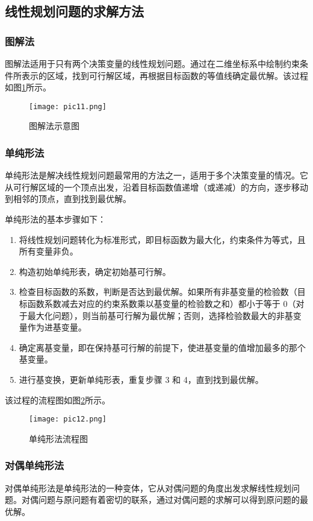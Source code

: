 \documentclass[bachelor]{thesis-uestc}
\begin{document}
\subsection{线性规划问题的求解方法}
\subsubsection{图解法}
图解法适用于只有两个决策变量的线性规划问题。通过在二维坐标系中绘制约束条件所表示的区域，找到可行解区域，再根据目标函数的等值线确定最优解。该过程如图\ref{pic11}所示。
\begin{figure}[h]
    \texttt{[image: pic11.png]}
    \caption{图解法示意图}
    \label{pic11}
    \end{figure}

    \subsubsection{单纯形法}
    单纯形法是解决线性规划问题最常用的方法之一，适用于多个决策变量的情况。它从可行解区域的一个顶点出发，沿着目标函数值递增（或递减）的方向，逐步移动到相邻的顶点，直到找到最优解。
    
    单纯形法的基本步骤如下：
    \begin{enumerate}
        \item 将线性规划问题转化为标准形式，即目标函数为最大化，约束条件为等式，且所有变量非负。
        \item 构造初始单纯形表，确定初始基可行解。
        \item 检查目标函数的系数，判断是否达到最优解。如果所有非基变量的检验数（目标函数系数减去对应的约束系数乘以基变量的检验数之和）都小于等于 0（对于最大化问题），则当前基可行解为最优解；否则，选择检验数最大的非基变量作为进基变量。
        \item 确定离基变量，即在保持基可行解的前提下，使进基变量的值增加最多的那个基变量。
        \item 进行基变换，更新单纯形表，重复步骤 3 和 4，直到找到最优解。
    \end{enumerate}
    该过程的流程图如图\ref{pic12}所示。
    
    \begin{figure}[h]
        \texttt{[image: pic12.png]}
        \caption{单纯形法流程图}
        \label{pic12}
    \end{figure}

\subsubsection{对偶单纯形法}
对偶单纯形法是单纯形法的一种变体，它从对偶问题的角度出发求解线性规划问题。对偶问题与原问题有着密切的联系，通过对偶问题的求解可以得到原问题的最优解。
\end{document}

